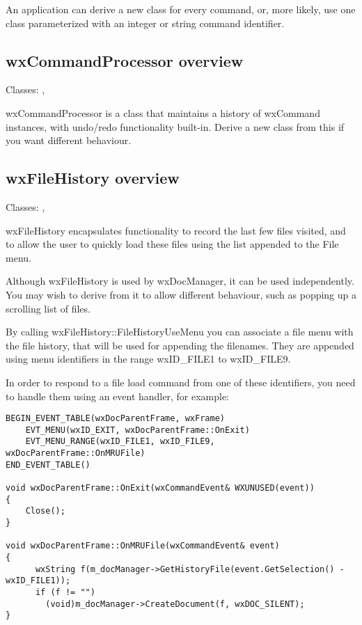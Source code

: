 An application can derive a new class for every command, or, more likely, use
one class parameterized with an integer or string command identifier.

\subsection{wxCommandProcessor overview}\label{wxcommandprocessoroverview}


Classes: , 

wxCommandProcessor is a class that maintains a history of wxCommand
instances, with undo/redo functionality built-in. Derive a new class from this
if you want different behaviour.

\subsection{wxFileHistory overview}\label{wxfilehistoryoverview}


Classes: , 

wxFileHistory encapsulates functionality to record the last few files visited, and
to allow the user to quickly load these files using the list appended to the File menu.

Although wxFileHistory is used by wxDocManager, it can be used independently. You may wish
to derive from it to allow different behaviour, such as popping up a scrolling
list of files.

By calling wxFileHistory::FileHistoryUseMenu you can associate a file menu with
the file history, that will be used for appending the filenames. They are
appended using menu identifiers in the range wxID\_FILE1 to wxID\_FILE9.

In order to respond to a file load command from one of these identifiers,
you need to handle them using an event handler, for example:

{\small
\begin{verbatim}
BEGIN_EVENT_TABLE(wxDocParentFrame, wxFrame)
    EVT_MENU(wxID_EXIT, wxDocParentFrame::OnExit)
    EVT_MENU_RANGE(wxID_FILE1, wxID_FILE9, wxDocParentFrame::OnMRUFile)
END_EVENT_TABLE()

void wxDocParentFrame::OnExit(wxCommandEvent& WXUNUSED(event))
{
    Close();
}

void wxDocParentFrame::OnMRUFile(wxCommandEvent& event)
{
      wxString f(m_docManager->GetHistoryFile(event.GetSelection() - wxID_FILE1));
      if (f != "")
        (void)m_docManager->CreateDocument(f, wxDOC_SILENT);
}
\end{verbatim}
}

